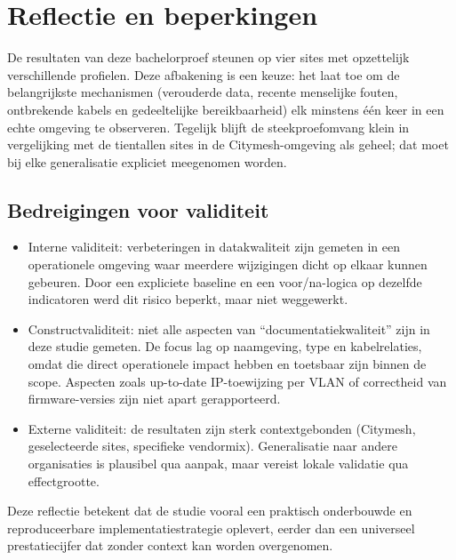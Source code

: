 \section{Reflectie en beperkingen}

De resultaten van deze bachelorproef steunen op vier sites met opzettelijk verschillende profielen. Deze afbakening is een keuze: het laat toe om de belangrijkste mechanismen (verouderde data, recente menselijke fouten, ontbrekende kabels en gedeeltelijke bereikbaarheid) elk minstens \'e\'en keer in een echte omgeving te observeren. Tegelijk blijft de steekproefomvang klein in vergelijking met de tientallen sites in de Citymesh-omgeving als geheel; dat moet bij elke generalisatie expliciet meegenomen worden.

\subsection*{Bedreigingen voor validiteit}

\begin{itemize}
  \item Interne validiteit: verbeteringen in datakwaliteit zijn gemeten in een operationele omgeving waar meerdere wijzigingen dicht op elkaar kunnen gebeuren. Door een expliciete baseline en een voor/na-logica op dezelfde indicatoren werd dit risico beperkt, maar niet weggewerkt.
  \item Constructvaliditeit: niet alle aspecten van ``documentatiekwaliteit'' zijn in deze studie gemeten. De focus lag op naamgeving, type en kabelrelaties, omdat die direct operationele impact hebben en toetsbaar zijn binnen de scope. Aspecten zoals up-to-date IP-toewijzing per VLAN of correctheid van firmware-versies zijn niet apart gerapporteerd.
  \item Externe validiteit: de resultaten zijn sterk contextgebonden (Citymesh, geselecteerde sites, specifieke vendormix). Generalisatie naar andere organisaties is plausibel qua aanpak, maar vereist lokale validatie qua effectgrootte.
\end{itemize}

Deze reflectie betekent dat de studie vooral een praktisch onderbouwde en reproduceerbare implementatiestrategie oplevert, eerder dan een universeel prestatiecijfer dat zonder context kan worden overgenomen.
